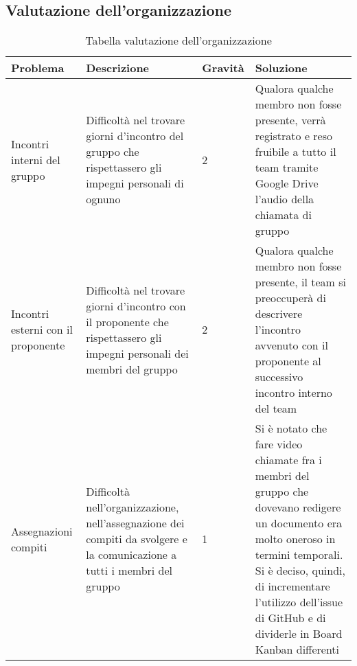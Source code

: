 \subsection{Valutazione dell'organizzazione}

{

\centering
\renewcommand{\arraystretch}{2}
\begin{longtable}{C{2cm} C{5cm} C{2cm} C{5.2cm}}
\caption{Tabella valutazione dell'organizzazione}\\
\textbf{Problema} &
\textbf{Descrizione}&
\textbf{Gravità}&
\textbf{Soluzione}\\
\endhead


Incontri interni del gruppo & Difficoltà nel trovare giorni d'incontro del gruppo che rispettassero gli impegni personali di ognuno & 2 & Qualora qualche membro non fosse presente, verrà registrato e reso fruibile a tutto il team tramite Google Drive l'audio della chiamata di gruppo\\
Incontri esterni con il proponente & Difficoltà nel trovare giorni d'incontro con il proponente che rispettassero gli impegni personali dei membri del gruppo & 2 & Qualora qualche membro non fosse presente, il team si preoccuperà di descrivere l'incontro avvenuto con il proponente al successivo incontro interno del team\\
Assegnazioni compiti & Difficoltà nell'organizzazione, nell'assegnazione dei compiti da svolgere e la comunicazione a tutti i membri del gruppo & 1 & Si è notato che fare video chiamate fra i membri del gruppo che dovevano redigere un documento era molto oneroso in termini temporali. Si è deciso, quindi,  di incrementare l'utilizzo dell'issue di GitHub e di dividerle in Board Kanban differenti\\


\end{longtable}
}
